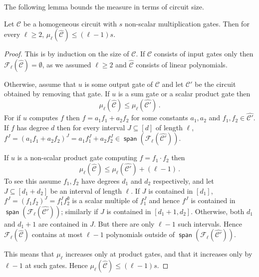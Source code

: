\documentclass[10pt,a4paper]{article}
\newcommand{\an}[1]{\textcolor{red}{#1}}
\newcommand{\ckt}{\textbf{$\mathcal{C}$}}
\newcommand{\spn}{\operatorname{\mathsf{span}}}
\renewcommand{\fam}{\textbf{$\mathcal{F}$}}
\begin{document}
The following lemma bounds the measure in terms of circuit size. 



\begin{lemma}\label{lem:meausure_ub_hom_nc_ckt}\label{lem:mu}
  Let $\ckt$ be a homogeneous circuit with $s$ non-scalar multiplication gates. Then for every $\ell\geq 2$, $\mu_\ell(\widehat {\ckt})\leq (\ell-1)s$. 
\end{lemma}

\begin{proof} 
  This is by induction on the size of $\ckt$. 
  If $\ckt$ consists of input gates only then $\fam_\ell(\widehat {\ckt})=\emptyset$, as we assumed $\ell\geq 2$ and $\widehat {\ckt}$ consists of linear polynomials. 

  Otherwise, assume that $u$ is some output gate of $\ckt$ and let $\ckt'$ be the circuit obtained by removing that gate. 
  If $u$ is a sum gate or a scalar product gate then 
  \[
    \mu_\ell(\widehat {\ckt})\leq  \mu_\ell(\widehat {\ckt'})\,.
  \]
  For if $u$ computes $f$  then $f=a_1f_1+a_2f_2$ for some constants $a_1, a_2$ and $f_1,f_2\in \widehat {\ckt'}$. 
  If $f$ has  degree $d$ then for every interval  $J\subseteq [d]$ of length $\ell$, $f^J=(a_1f_1+a_2f_2)^J= a_1f_1^J+a_2f_2^J\in \spn(\fam_\ell(\widehat{\ckt'}))$. 

  If $u$ is a non-scalar product gate computing $f=f_1\cdot f_2$ then 
  \[
    \mu_\ell(\widehat {\ckt})\leq \mu_\ell(\widehat {\ckt'})+ (\ell-1)\,.
  \]
  To see this assume $f_1,f_2$ have degrees $d_1$ and $d_2$ respectively, and let $J\subseteq [d_1+d_2]$ be an interval of length $\ell$. 
  If $J$ is contained in $[d_1]$, $f^J= (f_1f_2)^J= f_1^J f_2^\emptyset$ is a scalar multiple of $f_1^J$ and hence $f^J$ is contained in $\spn(\fam_\ell(\widehat {\ckt'}))$; similarly if $J$ is contained in $[d_1+1,d_2]$. 
  Otherwise, both $d_1$ and $d_1+1$ are contained in $J$. 
  But there are only $\ell-1$ such intervals.  
  Hence $\fam_\ell(\widehat {\ckt})$ contains at most $\ell-1$ polynomials outside of $\spn(\fam_\ell(\widehat {\ckt'}))$. 
 
  This means that $\mu_\ell$ increases only at product gates, and that it increases only by $\ell-1$ at such gates.
  Hence $\mu_\ell(\widehat {\ckt})\leq (\ell-1)s$.
\end{proof}
\end{document}
